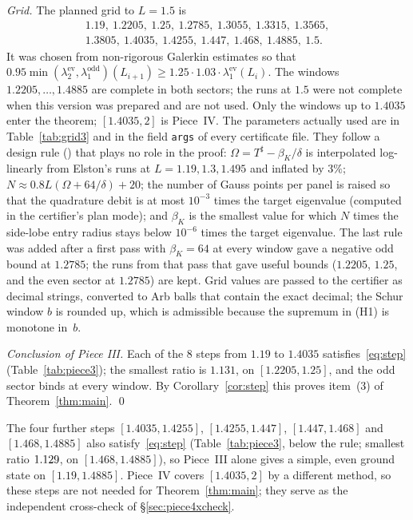 \documentclass[11pt]{amsart}
\newcommand{\ev}{\mathrm{ev}}
\newcommand{\od}{\mathrm{odd}}
\newcommand{\Tsh}{T^{\sharp}}
\newcommand{\file}[1]{{\small\path{#1}}}
\theoremstyle{definition}
\theoremstyle{remark}
\numberwithin{equation}{section}
\begin{document}
\emph{Grid.} The planned grid to $L=1.5$ is
\begin{gather*}
1.19,\ 1.2205,\ 1.25,\ 1.2785,\ 1.3055,\ 1.3315,\ 1.3565,\\
1.3805,\ 1.4035,\ 1.4255,\ 1.447,\ 1.468,\ 1.4885,\ 1.5 .
\end{gather*}
It was chosen from non-rigorous Galerkin estimates so that $0.95\min(\lambda_2^\ev,\lambda_1^\od)(L_{i+1})\ge1.25\cdot1.03\cdot\lambda_1^\ev(L_i)$. The windows $1.2205,\dots,1.4885$ are complete in both sectors; the runs at $1.5$ were not complete when this version was prepared and are not used. Only the windows up to $1.4035$ enter the theorem; $[1.4035,2]$ is Piece~IV. The parameters actually used are in Table~\ref{tab:grid3} and in the field \texttt{args} of every certificate file. They follow a design rule (\file{code/gap/params.py}) that plays no role in the proof: $\Omega=\Tsh-\beta_K/\delta$ is interpolated log-linearly from Elston's runs at $L=1.19,1.3,1.495$ and inflated by $3\%$; $N\approx0.8L(\Omega+64/\delta)+20$; the number of Gauss points per panel is raised so that the quadrature debit is at most $10^{-3}$ times the target eigenvalue (computed in the certifier's plan mode); and $\beta_K$ is the smallest value for which $N$ times the side-lobe entry radius stays below $10^{-6}$ times the target eigenvalue. The last rule was added after a first pass with $\beta_K=64$ at every window gave a negative odd bound at $1.2785$; the runs from that pass that gave useful bounds ($1.2205$, $1.25$, and the even sector at $1.2785$) are kept. Grid values are passed to the certifier as decimal strings, converted to Arb balls that contain the exact decimal; the Schur window $b$ is rounded up, which is admissible because the supremum in (H1) is monotone in~$b$.

\emph{Conclusion of Piece III.} Each of the $8$ steps from $1.19$ to $1.4035$ satisfies~\eqref{eq:step} (Table~\ref{tab:piece3}); the smallest ratio is $1.131$, on $[1.2205,1.25]$, and the odd sector binds at every window. By Corollary~\ref{cor:step} this proves item~(3) of Theorem~\ref{thm:main}. \qed

The four further steps $[1.4035,1.4255]$, $[1.4255,1.447]$, $[1.447,1.468]$ and $[1.468,1.4885]$ also satisfy~\eqref{eq:step} (Table~\ref{tab:piece3}, below the rule; smallest ratio $1.129$, on $[1.468,1.4885]$), so Piece~III alone gives a simple, even ground state on $[1.19,1.4885]$. Piece~IV covers $[1.4035,2]$ by a different method, so these steps are not needed for Theorem~\ref{thm:main}; they serve as the independent cross-check of \S\ref{sec:piece4xcheck}.
\end{document}
